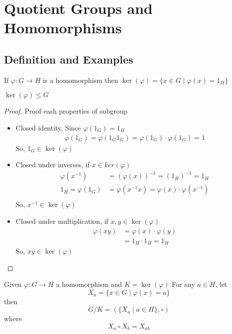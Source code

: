 \chapter{Quotient Groups and Homomorphisms}

\section{Definition and Examples}

\begin{definition}
  If $\varphi: G \to H$ is a homomorphism then $\ker(\varphi) = \{x \in G \mid \varphi(x) = 1_H\}$
\end{definition}

\begin{lemma}
  $\ker(\varphi) \le G$
\end{lemma}

\begin{proof}
  Proof eash properties of subgroup 
  \begin{itemize}
    \item Closed identity, Since $\varphi(1_G) = 1_H$ 
    \begin{align*}
      \varphi(1_G) = \varphi(1_G1_G) = \varphi(1_G)\cdot\varphi(1_G) = 1
    \end{align*}
    So, $1_G \in \ker(\varphi)$
    \item Closed under inverses, if $x \in ker(\varphi)$
    \begin{align*}
      \varphi(x^{-1}) &= (\varphi(x))^{-1} = (1_H)^{-1} = 1_H \\
      1_H = \varphi(1_G) &= \varphi(x^{-1}x) = \varphi(x)\cdot \varphi(x^{-1})\\
    \end{align*}
    So, $x^{-1} \in \ker(\varphi)$
    \item Closed under multiplication, if $x,y \in \ker(\varphi)$
    \begin{align*}
      \varphi(xy) &= \varphi(x) \cdot \varphi(y) \\
      &= 1_H \cdot 1_H = 1_H
    \end{align*}
    So, $xy \in \ker(\varphi)$
  \end{itemize}
\end{proof}

\begin{definition}
  Given $\varphi: G \to H$ a homomorphism and $K = \ker(\varphi)$ 
  For any $a \in H$, let $$X_a = \{x \in G \mid \varphi(x) = a\}$$
  then
  $$G/K = (\{X_a \mid a \in H\}, \circ)$$ where $$X_a \circ X_b = X_{ab}$$
\end{definition}

